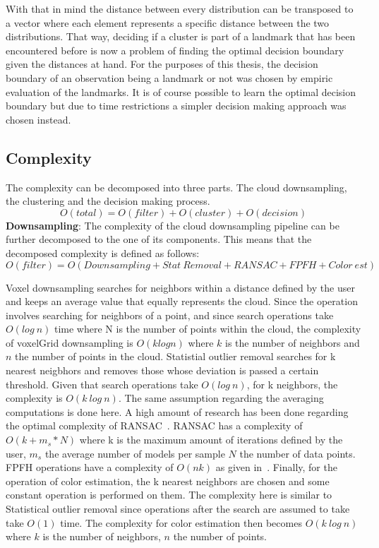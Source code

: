 \documentclass [twoside,hidelinks]{article}
\begin{document}
With that in mind the distance between every distribution can be transposed to a vector where each element represents a specific distance between the two distributions. That way, deciding if a cluster is part of a landmark that has been encountered before is now a problem of finding the optimal decision boundary given the distances at hand. For the purposes of this thesis, the decision boundary of an observation being a landmark or not was chosen by empiric evaluation of the landmarks. It is of course possible to learn the optimal decision boundary but due to time restrictions a simpler decision making approach was chosen instead.

\subsection{Complexity}
\label{subsec:complexity}
The complexity can be decomposed into three parts. The cloud downsampling, the clustering and the decision making process.
$$
O (total) = O (filter) + O (cluster) + O (decision)
$$
\textbf{Downsampling}: The complexity of the cloud downsampling pipeline can be further decomposed to the one of its components. This means that the decomposed complexity is defined as follows:
$$O (filter) = O (Downsampling + Stat\ Removal + RANSAC+ FPFH + Color\ est) $$

Voxel downsampling searches for neighbors within a distance defined by the user and keeps an average value that equally represents the cloud. Since the operation involves searching for neighbors of a point, and since search operations take $O (log\ n)$ time where N is the number of points within the cloud, the complexity of voxelGrid downsampling is $O (k log n)$ where $k$ is the number of neighbors and $n$ the number of points in the cloud. 
Statistial outlier removal searches for k nearest neigbhors and removes those whose deviation is passed a certain threshold. Given that search operations take $O (log\ n)$, for k neighbors, the complexity is $O (k\ log\ n)$. The same assumption regarding the averaging computations is done here.
A high amount of research has been done regarding the optimal complexity of RANSAC~\cite{RANSAC}. RANSAC has a complexity of $ O (k+ m_s*N)$ where k is the maximum amount of iterations defined by the user, $m_s$ the average number of models per sample $N$ the number of data points.
FPFH operations have a complexity of $O (nk)$ as given in~\cite{fpfh}.
Finally, for the operation of color estimation, the k nearest neighbors are chosen and some constant operation is performed on them. The complexity here is similar to Statistical outlier removal since operations after the search are assumed to take take $O (1)$ time. The complexity for color estimation then becomes $O (k\ log\ n)$ where $k$ is the number of neighbors, $n$ the number of points. 
\end{document}
